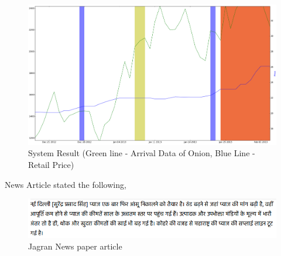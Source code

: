 \documentclass[a4paper,10pt]{article}
\begin{document}
			\begin{figure}[H]
		    	\centering
  		    	\includegraphics[width=1.1\textwidth]{graphs/localDelhiRegionalNewsPlusNexus.png}
		    	\caption{System Result (Green line - Arrival Data of Onion, Blue Line - Retail Price)}
		    	\label{fig:localExample}
			\end{figure}
			
News Article stated the following,

		\begin{figure}[H]
		    	\centering
  		    	\includegraphics[width=1.1\textwidth]{graphs/localDelhiFog.png}
		    	\caption{Jagran News paper article}
		    	\label{fig:localDelhiFog}
		\end{figure}
\end{document}

